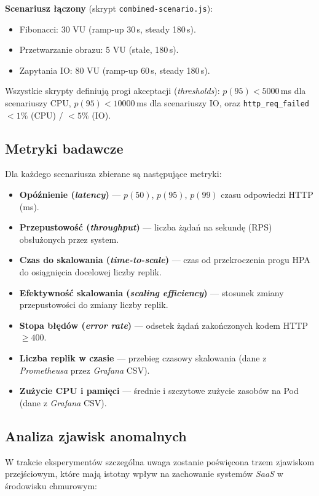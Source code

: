 \textbf{Scenariusz łączony} (skrypt \texttt{combined-scenario.js}):
\begin{itemize}
  \item Fibonacci: 30 VU (ramp-up 30\,s, steady 180\,s).
  \item Przetwarzanie obrazu: 5 VU (stałe, 180\,s).
  \item Zapytania IO: 80 VU (ramp-up 60\,s, steady 180\,s).
\end{itemize}

Wszystkie skrypty definiują progi akceptacji (\textit{thresholds}): $p(95) < 5000$\,ms dla scenariuszy CPU, $p(95) < 10000$\,ms dla scenariuszy IO, oraz \texttt{http\_req\_failed} $< 1\%$ (CPU) / $< 5\%$ (IO).

\subsection{Metryki badawcze}

Dla każdego scenariusza zbierane są następujące metryki:

\begin{itemize}
  \item \textbf{Opóźnienie (\textit{latency})} — $p(50)$, $p(95)$, $p(99)$ czasu odpowiedzi HTTP (ms).
  \item \textbf{Przepustowość (\textit{throughput})} — liczba żądań na sekundę (RPS) obsłużonych przez system.
  \item \textbf{Czas do skalowania (\textit{time-to-scale})} — czas od przekroczenia progu HPA do osiągnięcia docelowej liczby replik.
  \item \textbf{Efektywność skalowania (\textit{scaling efficiency})} — stosunek zmiany przepustowości do zmiany liczby replik.
  \item \textbf{Stopa błędów (\textit{error rate})} — odsetek żądań zakończonych kodem HTTP $\geq 400$.
  \item \textbf{Liczba replik w czasie} — przebieg czasowy skalowania (dane z \textit{Prometheusa} przez \textit{Grafana} CSV).
  \item \textbf{Zużycie CPU i pamięci} — średnie i szczytowe zużycie zasobów na Pod (dane z \textit{Grafana} CSV).
\end{itemize}

\subsection{Analiza zjawisk anomalnych}

W trakcie eksperymentów szczególna uwaga zostanie poświęcona trzem zjawiskom przejściowym, które mają istotny wpływ na zachowanie systemów \textit{SaaS} w środowisku chmurowym:

